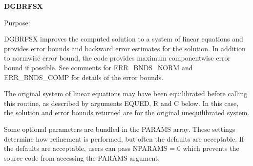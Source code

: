 {\bfseries D\+G\+B\+R\+F\+S\+X} 

 \begin{DoxyParagraph}{Purpose\+: }
\begin{DoxyVerb}    DGBRFSX improves the computed solution to a system of linear
    equations and provides error bounds and backward error estimates
    for the solution.  In addition to normwise error bound, the code
    provides maximum componentwise error bound if possible.  See
    comments for ERR_BNDS_NORM and ERR_BNDS_COMP for details of the
    error bounds.

    The original system of linear equations may have been equilibrated
    before calling this routine, as described by arguments EQUED, R
    and C below. In this case, the solution and error bounds returned
    are for the original unequilibrated system.\end{DoxyVerb}
 \begin{DoxyVerb}     Some optional parameters are bundled in the PARAMS array.  These
     settings determine how refinement is performed, but often the
     defaults are acceptable.  If the defaults are acceptable, users
     can pass NPARAMS = 0 which prevents the source code from accessing
     the PARAMS argument.\end{DoxyVerb}

\end{DoxyParagraph}

